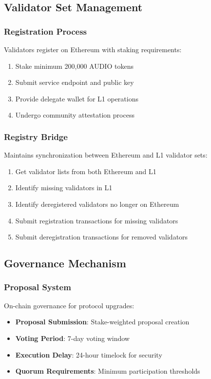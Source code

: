 \documentclass[11pt,a4paper]{article}
\begin{document}
\subsection{Validator Set Management}

\subsubsection{Registration Process}
Validators register on Ethereum with staking requirements:

\begin{enumerate}
  \item Stake minimum 200,000 AUDIO tokens
  \item Submit service endpoint and public key
  \item Provide delegate wallet for L1 operations
  \item Undergo community attestation process
\end{enumerate}

\subsubsection{Registry Bridge}
Maintains synchronization between Ethereum and L1 validator sets:

\begin{enumerate}
  \item Get validator lists from both Ethereum and L1
  \item Identify missing validators in L1
  \item Identify deregistered validators no longer on Ethereum
  \item Submit registration transactions for missing validators
  \item Submit deregistration transactions for removed validators
\end{enumerate}

\subsection{Governance Mechanism}

\subsubsection{Proposal System}
On-chain governance for protocol upgrades:

\begin{itemize}
  \item \textbf{Proposal Submission}: Stake-weighted proposal creation
  \item \textbf{Voting Period}: 7-day voting window
  \item \textbf{Execution Delay}: 24-hour timelock for security
  \item \textbf{Quorum Requirements}: Minimum participation thresholds
\end{itemize}
\end{document}
